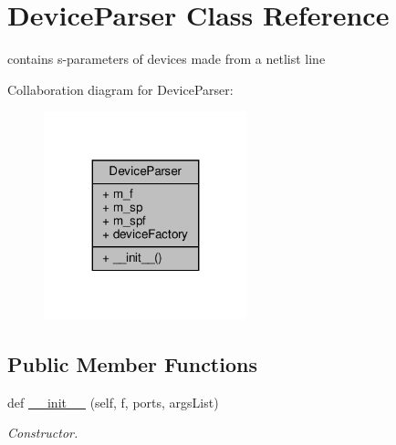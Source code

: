 \hypertarget{classSignalIntegrity_1_1Parsers_1_1Devices_1_1DeviceParser_1_1DeviceParser}{}\section{Device\+Parser Class Reference}
\label{classSignalIntegrity_1_1Parsers_1_1Devices_1_1DeviceParser_1_1DeviceParser}


contains s-\/parameters of devices made from a netlist line  




Collaboration diagram for Device\+Parser\+:\nopagebreak
\begin{figure}[H]
\begin{center}
\leavevmode
\includegraphics[width=167pt]{classSignalIntegrity_1_1Parsers_1_1Devices_1_1DeviceParser_1_1DeviceParser__coll__graph}
\end{center}
\end{figure}
\subsection*{Public Member Functions}
\begin{DoxyCompactItemize}
\item 
def \hyperlink{classSignalIntegrity_1_1Parsers_1_1Devices_1_1DeviceParser_1_1DeviceParser_a286a7f15e5aa7761d219f91accd234c1}{\+\_\+\+\_\+init\+\_\+\+\_\+} (self, f, ports, args\+List)
\begin{DoxyCompactList}\small\item\em Constructor. \end{DoxyCompactList}\end{DoxyCompactItemize}

